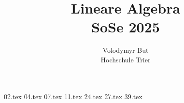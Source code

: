 \documentclass[10pt, oneside]{article}
\title{Lineare Algebra\\[10pt]\Large{SoSe 2025}}
\author{Volodymyr But\\[10pt]Hochschule Trier}
\date{}
\begin{document}
\maketitle
\vspace{25px}

{02.tex}
{04.tex}
{07.tex}
{11.tex}
{24.tex}
{27.tex}
\pagebreak
{39.tex}
\end{document}
